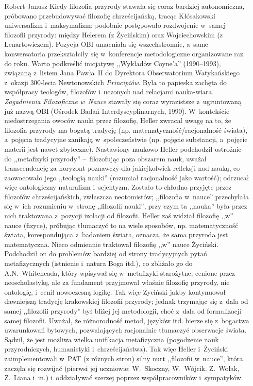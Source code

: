 \begin{newrevplenv}{Robert Janusz}
 Kiedy filozofia przyrody stawała się coraz bardziej autonomiczna, próbowano przebudowywać filozofię chrześcijańską, tracąc Kłósakowski uniwersalizm i~maksymalizm; podobnie postępowało rozdwojenie w~samej filozofii przyrody: między Helerem (z Życińskim) oraz Wojciechowskim (z Lenartowiczem). Pozycja OBI umacniała się wszechstronnie, a~same konwersatoria przekształciły się w~konferencje metodologiczne organizowane raz do roku. Warto podkreślić inicjatywę ,,Wykładów Coyne'a'' (1990--1993), związaną z~listem Jana Pawła~II do Dyrektora Obserwatorium Watykańskiego z~okazji 300-lecia Newtonowskich \textit{Principiów}. Była to papieska zachęta do współpracy teologów, filozofów i~uczonych nad relacjami nauka-wiara. \textit{Zagadnienia Filozoficzne w~Nauce} stawały się coraz wyrazistsze z~ugruntowaną już nazwą OBI (Ośrodek Badań Interdyscyplinarnych, 1990). W~kontekście niedostrzegania owoców nauki przez filozofię, Heller zwracał uwagę na to, że filozofia przyrody ma bogatą tradycję (np. matematyczność/racjonalność świata), a~pojęcia tradycyjne zanikają w~społeczeństwie (np. pojęcie substancji, a~pojęcie materii jest nawet zbyteczne). Nastawiony naukowo Heller podchodził ostrożnie do ,,metafizyki przyrody'' --~filozofując poza obszarem nauk, uważał transcendencję za horyzont poznawczy dla jakiejkolwiek refleksji nad nauką, co zaowocowało jego ,,teologią nauki'' (rozumiał racjonalność jako wartość); odrzucał więc ontologiczny naturalizm i~scjentyzm. Zostało to chłodno przyjęte przez filozofów chrześcijańskich, zwłaszcza neotomistów; ,,filozofia w~nauce'' przechylała się w~ich rozumieniu w~stronę ,,filozofii nauki'', przy czym ta ,,nauka'' była przez nich traktowana z~pozycji izolacji od filozofii. Heller zaś widział filozofię ,,w'' nauce (fizyce), próbując tłumaczyć to na wiele sposobów, np. matematyczność świata, korespondująca z~badaniem świata, oznacza, że sama przyroda jest matematyczna. Nieco odmiennie traktował filozofię ,,w'' nauce Życiński. Podchodził on do problemów bardziej od strony tradycyjnych pytań metafizycznych (istnienie i~natura Boga itd.), co zbliżało go do A.N.~Whiteheada, który wpisywał się w~metafizyki starożytne, cenione przez neoscholastykę, ale za fundament przyjmował właśnie filozofię przyrody, nie ontologię, i~cenił nowoczesną logikę. Tak więc Życiński jakby kontynuował dawniejszą tradycję krakowskiej filozofii przyrody; jednak trzymając się z~dala od samej ,,filozofii przyrody'' był bliżej jej metodologii, choć z~dala od formalizacji samej filozofii. Uważał, że różnorodność metod, języków itd. bierze się z~bogactwa uwarunkowań bytowych, pozwalających racjonalnie tłumaczyć obserwacje świata. Sądził, że jest możliwa wielka unifikacja metafizyczna (pogodzenie nauk przyrodniczych, humanistyki i~chrześcijaństwa). Tak więc Heller i~Życiński zaimplementowali w~PAT (z różnych stron) silny nurt ,,filozofii w~nauce'', która zaczęła się rozwijać (pierwsi jej uczniowie: W.~Skoczny, W.~Wójcik, Z.~Wolak, Z.~Liana i~in.) i~oddziaływać szerzej poprzez współpracowników i~sympatyków.


\end{newrevplenv}
